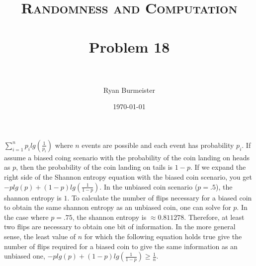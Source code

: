 \documentclass[fontsize=12pt]{article}
\title{ 
  \normalfont \normalsize 
  \textsc{Randomness and Computation} \\ [25pt] %
  \horrule{0.5pt} \\[0.4cm] %
  \huge Problem 18 \\ %
  \horrule{2pt} \\[0.5cm] %
}
\author{Ryan Burmeister} %
\date{\normalsize\today} %
\numberwithin{equation}{section} %
\numberwithin{figure}{section} %
\numberwithin{table}{section} %
\begin{document}
\maketitle %

$\sum_{i=1}^{n}p_ilg(\frac{1}{p_i})$ where $n$ events are possible and each
event has probability $p_i$.  If assume a biased coing scenario with the
probability of the coin landing on heads as $p$, then the probability of the
coin landing on tails is $1-p$. If we expand the right side of the Shannon
entropy equation with the biased coin scenario, you get
$-plg(p)+(1-p)lg(\frac{1}{1-p})$.  In the unbiased coin scenario ($p=.5$), the
shannon entropy is $1$.  To calculate the number of flips necessary for a
biased coin to obtain the same shannon entropy as an unbiased coin, one can
solve for $p$.  In the case where $p=.75$, the shannon entropy is $\approx
0.811278$.  Therefore, at least two flips are necessary to obtain one bit of
information.  In the more general sense, the least value of $n$ for which the
following equation holds true give the number of flips required for a biased
coin to give the same information as an unbiased one,
$-plg(p)+(1-p)lg(\frac{1}{1-p}) \geq \frac{1}{n}$.
\end{document}
